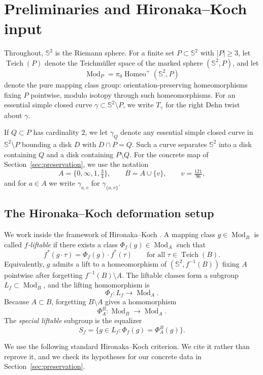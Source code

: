 \documentclass[12pt]{article}
\theoremstyle{definition}
\theoremstyle{remark}
\numberwithin{equation}{section}
\newcommand{\Sph}{\mathbb S}
\newcommand{\Teich}{\operatorname{Teich}}
\newcommand{\Mod}{\operatorname{Mod}}
\newcommand{\Lf}{L_f}
\newcommand{\Sf}{S_f}
\newcommand{\HF}{\Phi_f}
\newcommand{\FAB}{\Phi_A^B}
\begin{document}
\section{Preliminaries and Hironaka--Koch input}
\label{sec:prelim}

Throughout, $\Sph^{2}$ is the Riemann sphere.  For a finite set
$P\subset\Sph^{2}$ with $|P|\ge3$, let $\Teich(P)$ denote the
Teichm\"uller space of the marked sphere $(\Sph^{2},P)$, and let
\[
\Mod_{P}=\pi_{0}\operatorname{Homeo}^{+}(\Sph^{2},P)
\]
denote the pure mapping class group: orientation-preserving
homeomorphisms fixing $P$ pointwise, modulo isotopy through such
homeomorphisms.  For an essential simple closed curve
$\gamma\subset\Sph^{2}\setminus P$, we write $T_{\gamma}$ for the right
Dehn twist about $\gamma$.

If $Q\subset P$ has cardinality $2$, we let $\gamma_{Q}$ denote any
essential simple closed curve in $\Sph^{2}\setminus P$ bounding a disk
$D$ with $D\cap P=Q$.  Such a curve separates $\Sph^{2}$ into a disk
containing $Q$ and a disk containing $P\setminus Q$.  For the concrete
map of Section~\ref{sec:preservation}, we use the notation
\[
A=\{0,\infty,1,\tfrac34\},\qquad
B=A\cup\{v\},\qquad
v=\tfrac{121}{96},
\]
and for $a\in A$ we write $\gamma_{a,v}$ for $\gamma_{\{a,v\}}$.

\subsection{The Hironaka--Koch deformation setup}

We work inside the framework of Hironaka--Koch \cite[§2.5--§2.6]{HK}.
A mapping class $g\in\Mod_{B}$ is called \emph{$f$-liftable} if there
exists a class $\HF(g)\in\Mod_{A}$ such that
\[
f^{*}(g\cdot\tau)=\HF(g)\cdot f^{*}(\tau)\qquad\text{for all }\tau\in\Teich(B).
\]
Equivalently, $g$ admits a lift to a homeomorphism of
$(\Sph^{2},f^{-1}(B))$ fixing $A$ pointwise after forgetting
$f^{-1}(B)\setminus A$.  The liftable classes form a subgroup
$\Lf\subset\Mod_{B}$, and the lifting homomorphism is
\[
\HF:\Lf\longrightarrow\Mod_{A}.
\]
Because $A\subset B$, forgetting $B\setminus A$ gives a homomorphism
\[
\FAB:\Mod_{B}\longrightarrow\Mod_{A}.
\]
The \emph{special liftable} subgroup is the equalizer
\[
\Sf=\{g\in\Lf:\HF(g)=\FAB(g)\}.
\]

We use the following standard Hironaka--Koch criterion.  We cite it
rather than reprove it, and we check its hypotheses for our concrete
data in Section~\ref{sec:preservation}.
\end{document}

